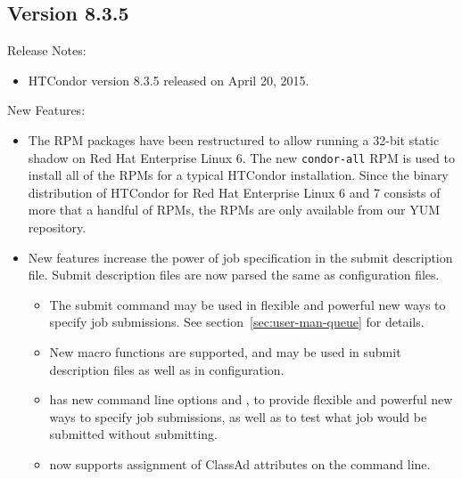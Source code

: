\subsection*{\label{sec:New-8-3-5}Version 8.3.5}

\noindent Release Notes:

\begin{itemize}

\item HTCondor version 8.3.5 released on April 20, 2015.

\end{itemize}


\noindent New Features:

\begin{itemize}

\item The RPM packages have been restructured to allow running a 32-bit
static shadow on Red Hat Enterprise Linux 6. The new \texttt{condor-all}
RPM is used to install all of the RPMs for a typical HTCondor installation.
Since the binary distribution of HTCondor for Red Hat Enterprise Linux 6 and 7
consists of more that a handful of RPMs, the RPMs are only available from our
YUM repository.

\item New features increase the power of job specification
in the submit description file. 
Submit description files are now parsed the same as configuration files.

  \begin{itemize}
  \item The  submit command may be used in
flexible and powerful new ways to specify job submissions.
See section~\ref{sec:user-man-queue} for details.

  \item New macro functions are supported, 
and may be used in submit description files as well as in configuration.

  \item {} has new command line options  
and ,
to provide flexible and powerful new ways to specify job submissions,
as well as to test what job would be submitted without submitting.

  \item {} now supports assignment of ClassAd attributes
on the command line.


\end{itemize}
\end{itemize}
